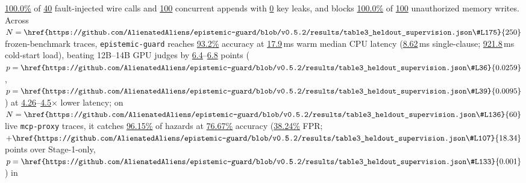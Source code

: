 \documentclass[10pt,twocolumn]{article}
\begin{document}
\begin{@twocolumnfalse}
\begin{center}
\begin{minipage}{0.94\textwidth}
\href{https://github.com/AlienatedAliens/epistemic-guard/blob/v0.5.2/results/table2_conformance.json\#L39}{100.0\%} of \href{https://github.com/AlienatedAliens/epistemic-guard/blob/v0.5.2/results/table2_conformance.json\#L34}{40} fault-injected wire calls and \href{https://github.com/AlienatedAliens/epistemic-guard/blob/v0.5.2/results/table2_conformance.json\#L5}{100} concurrent appends with \href{https://github.com/AlienatedAliens/epistemic-guard/blob/v0.5.2/results/table2_conformance.json\#L28}{0} key leaks, and blocks \href{https://github.com/AlienatedAliens/epistemic-guard/blob/v0.5.2/results/table2_conformance.json\#L60}{100.0\%} of \href{https://github.com/AlienatedAliens/epistemic-guard/blob/v0.5.2/results/table2_conformance.json\#L58}{100} unauthorized memory writes. Across $N=\href{https://github.com/AlienatedAliens/epistemic-guard/blob/v0.5.2/results/table3_heldout_supervision.json\#L175}{250}$ frozen-benchmark traces, \texttt{epistemic-guard} reaches \href{https://github.com/AlienatedAliens/epistemic-guard/blob/v0.5.2/results/table3_heldout_supervision.json\#L71}{93.2\%} accuracy at \href{https://github.com/AlienatedAliens/epistemic-guard/blob/v0.5.2/results/table3_heldout_supervision.json\#L86}{17.9}\,ms warm median CPU latency (\href{https://github.com/AlienatedAliens/epistemic-guard/blob/v0.5.2/results/table3_heldout_supervision.json\#L97}{8.62}\,ms single-clause; \href{https://github.com/AlienatedAliens/epistemic-guard/blob/v0.5.2/results/table3_heldout_supervision.json\#L78}{921.8}\,ms cold-start load), beating 12B--14B GPU judges by \href{https://github.com/AlienatedAliens/epistemic-guard/blob/v0.5.2/results/table3_heldout_supervision.json\#L24}{6.4}--\href{https://github.com/AlienatedAliens/epistemic-guard/blob/v0.5.2/results/table3_heldout_supervision.json\#L25}{6.8} points ($p=\href{https://github.com/AlienatedAliens/epistemic-guard/blob/v0.5.2/results/table3_heldout_supervision.json\#L36}{0.0259}$, $p=\href{https://github.com/AlienatedAliens/epistemic-guard/blob/v0.5.2/results/table3_heldout_supervision.json\#L39}{0.0095}$) at \href{https://github.com/AlienatedAliens/epistemic-guard/blob/v0.5.2/results/table3_heldout_supervision.json\#L41}{4.26}--\href{https://github.com/AlienatedAliens/epistemic-guard/blob/v0.5.2/results/table3_heldout_supervision.json\#L40}{4.5}$\times$ lower latency; on $N=\href{https://github.com/AlienatedAliens/epistemic-guard/blob/v0.5.2/results/table3_heldout_supervision.json\#L136}{60}$ live \texttt{mcp-proxy} traces, it catches \href{https://github.com/AlienatedAliens/epistemic-guard/blob/v0.5.2/results/table3_heldout_supervision.json\#L121}{96.15\%} of hazards at \href{https://github.com/AlienatedAliens/epistemic-guard/blob/v0.5.2/results/table3_heldout_supervision.json\#L108}{76.67\%} accuracy (\href{https://github.com/AlienatedAliens/epistemic-guard/blob/v0.5.2/results/table3_heldout_supervision.json\#L116}{38.24\%} FPR; $+\href{https://github.com/AlienatedAliens/epistemic-guard/blob/v0.5.2/results/table3_heldout_supervision.json\#L107}{18.34}$ points over Stage-1-only, $p=\href{https://github.com/AlienatedAliens/epistemic-guard/blob/v0.5.2/results/table3_heldout_supervision.json\#L133}{0.001}$) in 
\end{minipage}
\end{center}
\end{@twocolumnfalse}
\end{document}
